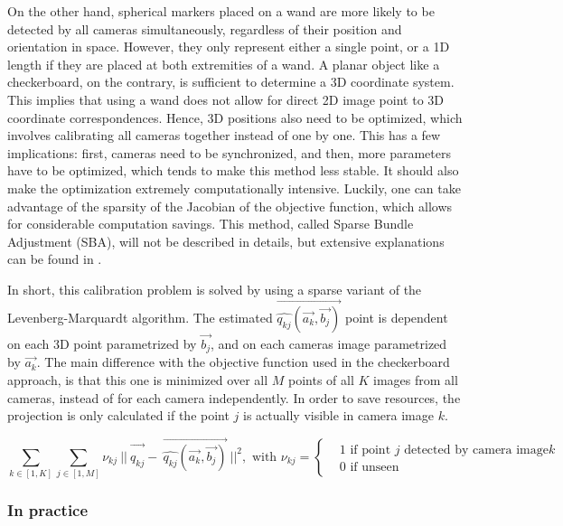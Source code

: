 On the other hand, spherical markers placed on a wand are more likely to be detected by all cameras simultaneously, regardless of their position and orientation in space. However, they only represent either a single point, or a 1D length if they are placed at both extremities of a wand. A planar object like a checkerboard, on the contrary, is sufficient to determine a 3D coordinate system. This implies that using a wand does not allow for direct 2D image point to 3D coordinate correspondences. Hence, 3D positions also need to be optimized, which involves calibrating all cameras together instead of one by one. This has a few implications: first, cameras need to be synchronized, and then, more parameters have to be optimized, which tends to make this method less stable. It should also make the optimization extremely computationally intensive. Luckily, one can take advantage of the sparsity of the Jacobian of the objective function, which allows for considerable computation savings. This method, called Sparse Bundle Adjustment (SBA), will not be described in details, but extensive explanations can be found in \cite{Lourakis2009}.

\newpage
In short, this calibration problem is solved by using a sparse variant of the Levenberg-Marquardt algorithm.  The estimated $\overrightarrow{\widehat{q_{kj}}(\overrightarrow{a_k}, \overrightarrow{b_j})}$ point is dependent on each 3D point parametrized by $\overrightarrow{b_j}$, and on each cameras image parametrized by $\overrightarrow{a_k}$. The main difference with the objective function used in the checkerboard approach, is that this one is minimized over all $M$ points of all $K$ images from all cameras, instead of for each camera independently. In order to save resources, the projection is only calculated if the point $j$ is actually visible in camera image $k$.

\begin{equation}
  \sum_{k \in [1,K]} \sum_{j \in [1,M]} 
  \nu_{kj} \ ||\ \overrightarrow{q_{kj}^{\ ^{\ ^{\ ^{\ }}}}} - \ 
  \overrightarrow{\widehat{q_{kj}}(\overrightarrow{a_k}, \overrightarrow{b_j})}\ 
  ||^2,  
  \textrm{ with }  
  \nu_{kj} = 
    \begin{cases}
        & 1 \textrm{ if point } j \textrm{ detected by camera image} k \\
        & 0 \textrm{ if unseen}
    \end{cases}
\end{equation} 


\subsubsection{In practice}  

